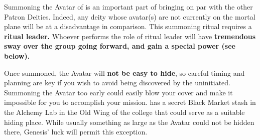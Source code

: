 \documentclass[green]{GL2020}
\begin{document}
\name{\gGenesisAvatar{}}

Summoning the Avatar of \cGenesis{} is an important part of bringing \cGenesis{} on par with the other Patron Deities. Indeed, any deity whose avatar(s) are not currently on the mortal plane will be at a disadvantage in comparison. This summoning ritual requires a \textbf{ritual leader.} Whoever performs the role of ritual leader will have \textbf{tremendous sway over the group going forward, and gain a special power (see below).} 

Once summoned, the Avatar will \textbf{not be easy to hide}, so careful timing and planning are key if you wish to avoid being discovered by the uninitiated. Summoning the Avatar too early could easily blow your cover and make it impossible for you to accomplish your mission.  \cChupInventor{\full} has a secret Black Market stash in the Alchemy Lab in the Old Wing of the college that could serve as a suitable hiding place. While usually something as large as the Avatar could not be hidden there, Genesis’ luck will permit this exception. 
\end{document}
